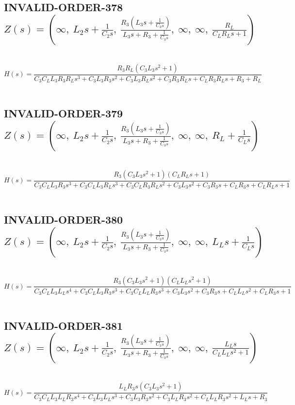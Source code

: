 \documentclass{article}
\begin{document}
\subsection{INVALID-ORDER-378 $Z(s) = \left( \infty, \  L_{2} s + \frac{1}{C_{2} s}, \  \frac{R_{3} \left(L_{3} s + \frac{1}{C_{3} s}\right)}{L_{3} s + R_{3} + \frac{1}{C_{3} s}}, \  \infty, \  \infty, \  \frac{R_{L}}{C_{L} R_{L} s + 1}\right)$ } \ 
\textbf{\[H(s) = \frac{R_{3} R_{L} \left(C_{3} L_{3} s^{2} + 1\right)}{C_{3} C_{L} L_{3} R_{3} R_{L} s^{3} + C_{3} L_{3} R_{3} s^{2} + C_{3} L_{3} R_{L} s^{2} + C_{3} R_{3} R_{L} s + C_{L} R_{3} R_{L} s + R_{3} + R_{L}}\] } \ 
\subsection{INVALID-ORDER-379 $Z(s) = \left( \infty, \  L_{2} s + \frac{1}{C_{2} s}, \  \frac{R_{3} \left(L_{3} s + \frac{1}{C_{3} s}\right)}{L_{3} s + R_{3} + \frac{1}{C_{3} s}}, \  \infty, \  \infty, \  R_{L} + \frac{1}{C_{L} s}\right)$ } \ 
\textbf{\[H(s) = \frac{R_{3} \left(C_{3} L_{3} s^{2} + 1\right) \left(C_{L} R_{L} s + 1\right)}{C_{3} C_{L} L_{3} R_{3} s^{3} + C_{3} C_{L} L_{3} R_{L} s^{3} + C_{3} C_{L} R_{3} R_{L} s^{2} + C_{3} L_{3} s^{2} + C_{3} R_{3} s + C_{L} R_{3} s + C_{L} R_{L} s + 1}\] } \ 
\subsection{INVALID-ORDER-380 $Z(s) = \left( \infty, \  L_{2} s + \frac{1}{C_{2} s}, \  \frac{R_{3} \left(L_{3} s + \frac{1}{C_{3} s}\right)}{L_{3} s + R_{3} + \frac{1}{C_{3} s}}, \  \infty, \  \infty, \  L_{L} s + \frac{1}{C_{L} s}\right)$ } \ 
\textbf{\[H(s) = \frac{R_{3} \left(C_{3} L_{3} s^{2} + 1\right) \left(C_{L} L_{L} s^{2} + 1\right)}{C_{3} C_{L} L_{3} L_{L} s^{4} + C_{3} C_{L} L_{3} R_{3} s^{3} + C_{3} C_{L} L_{L} R_{3} s^{3} + C_{3} L_{3} s^{2} + C_{3} R_{3} s + C_{L} L_{L} s^{2} + C_{L} R_{3} s + 1}\] } \ 
\subsection{INVALID-ORDER-381 $Z(s) = \left( \infty, \  L_{2} s + \frac{1}{C_{2} s}, \  \frac{R_{3} \left(L_{3} s + \frac{1}{C_{3} s}\right)}{L_{3} s + R_{3} + \frac{1}{C_{3} s}}, \  \infty, \  \infty, \  \frac{L_{L} s}{C_{L} L_{L} s^{2} + 1}\right)$ } \ 
\textbf{\[H(s) = \frac{L_{L} R_{3} s \left(C_{3} L_{3} s^{2} + 1\right)}{C_{3} C_{L} L_{3} L_{L} R_{3} s^{4} + C_{3} L_{3} L_{L} s^{3} + C_{3} L_{3} R_{3} s^{2} + C_{3} L_{L} R_{3} s^{2} + C_{L} L_{L} R_{3} s^{2} + L_{L} s + R_{3}}\] } \ 
\end{document}
